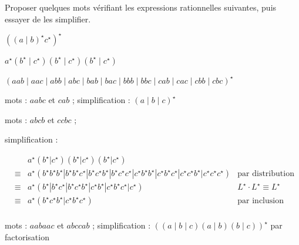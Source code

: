
\begingroup

\begin{exercice} \label{exo:lexing/arden/simplification}

  Proposer quelques mots vérifiant les expressions rationnelles suivantes, puis essayer de les simplifier.
  \begin{questions}
  \item $((a \mid  b)^\star  c^\star )^\star $
  \item $a^\star (b^\star  \mid  c^\star )(b^\star \mid  c^\star )(b^\star  \mid  c^\star )$
  \item $(aab \mid  aac \mid  abb \mid  abc \mid  bab \mid  bac \mid  bbb \mid  bbc \mid  cab \mid  cac \mid  cbb \mid  cbc)^\star $
  \end{questions}

\end{exercice}

\begin{corrections}

  \begin{questions}

  \item mots : $aabc$ et $cab$ ; simplification : $(a \mid  b \mid  c)^\star $
    
  \item mots : $abcb$ et $ccbc$ ;
    
    simplification :
    
    $\begin{array}{rcll}
      && a^\star (b^\star  |  c^\star )(b^\star |  c^\star )(b^\star  |  c^\star ) \\
      & \equiv & a^\star( b^\star b^\star b^\star |  b^\star b^\star c^\star |  b^\star c^\star b^\star |  b^\star c^\star c^\star  |  c^\star b^\star b^\star |  c^\star b^\star c^\star |  c^\star c^\star b^\star |  c^\star c^\star c^\star) & \text{par distribution}\\ 
      & \equiv & a^\star (b^\star |  b^\star c^\star |  b^\star c^\star b^\star |  c^\star b^\star |  c^\star b^\star c^\star |  c^\star) & L^\star\cdot L^\star  \equiv L^\star\\ 
      & \equiv & a^\star (b^\star c^\star b^\star |  c^\star b^\star c^\star) & \text{par inclusion}\\ 
    \end{array}$

  \item mots : $aabaac$ et $abccab$ ; simplification : $((a \mid  b \mid  c)(a \mid  b)(b \mid  c))^\star $ par factorisation
    
  \end{questions}

\end{corrections}

\endgroup
\endinput
